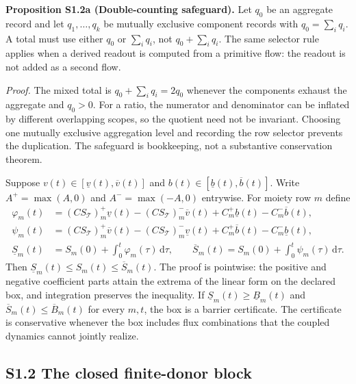 \documentclass[11pt]{article}
\newcommand{\dd}{\,\mathrm{d}}
\begin{document}
\textbf{Proposition S1.2a (Double-counting safeguard).} Let $q_0$ be an aggregate record and let $q_1,\ldots,q_k$ be mutually exclusive component records with $q_0=\sum_iq_i$. A total must use either $q_0$ or $\sum_iq_i$, not $q_0+\sum_iq_i$. The same selector rule applies when a derived readout is computed from a primitive flow: the readout is not added as a second flow.

\emph{Proof.} The mixed total is $q_0+\sum_iq_i=2q_0$ whenever the components exhaust the aggregate and $q_0>0$. For a ratio, the numerator and denominator can be inflated by different overlapping scopes, so the quotient need not be invariant. Choosing one mutually exclusive aggregation level and recording the row selector prevents the duplication. The safeguard is bookkeeping, not a substantive conservation theorem.

Suppose $v(t)\in[\underline v(t),\overline v(t)]$ and $b(t)\in[\underline b(t),\overline b(t)]$.  Write $A^+=\max(A,0)$ and $A^-\!=\max(-A,0)$ entrywise. For moiety row $m$ define
\begin{align}
\varphi_m(t)&=(CS_{\mathcal T})_m^+\underline v(t)-(CS_{\mathcal T})_m^-\overline v(t)+C_m^+\underline b(t)-C_m^-\overline b(t),\\
\psi_m(t)&=(CS_{\mathcal T})_m^+\overline v(t)-(CS_{\mathcal T})_m^-\underline v(t)+C_m^+\overline b(t)-C_m^-\underline b(t),\\
\underline S_m(t)&=S_m(0)+\int_0^t\varphi_m(\tau)\dd\tau,\qquad
\overline S_m(t)=S_m(0)+\int_0^t\psi_m(\tau)\dd\tau.
\end{align}
Then $\underline S_m(t)\leq S_m(t)\leq\overline S_m(t)$. The proof is pointwise: the positive and negative coefficient parts attain the extrema of the linear form on the declared box, and integration preserves the inequality. If $\underline S_m(t)\geq\underline B_m(t)$ and $\overline S_m(t)\leq\overline B_m(t)$ for every $m,t$, the box is a barrier certificate. The certificate is conservative whenever the box includes flux combinations that the coupled dynamics cannot jointly realize.

\subsection*{S1.2 The closed finite-donor block}
\end{document}
